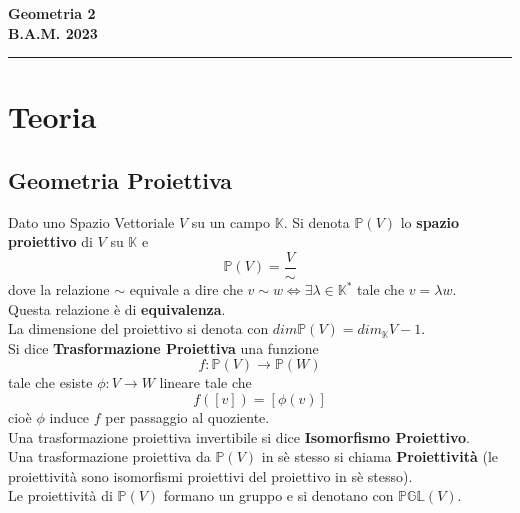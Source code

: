 \documentclass[a4paper,twoside]{article}
\newcommand{\Pro}{\mathbb{P}}
\newcommand{\K}{\mathbb{K}}
\theoremstyle{definition}
\numberwithin{theorem}{section}
\begin{document}
\setlength\parindent{0pt}
\thispagestyle{empty}
\begin{center}{\large \textbf{ {\Huge Geometria 2} \\
B.A.M. 2023}}
\end{center}
\rule{\textwidth}{1pt}
\tableofcontents
\newpage

\section{Teoria}
\subsection{Geometria Proiettiva}
Dato uno Spazio Vettoriale $V$ su un campo $\K$. Si denota $\Pro(V)$ lo \textbf{spazio proiettivo} di $V$ su $\K$ e
$$\Pro(V)= \frac{V}{\sim}$$
dove la relazione $\sim$ equivale a dire che $v\sim w \Leftrightarrow \exists\lambda\in\K^*$ tale che $v=\lambda w$.\\
Questa relazione è di \textbf{equivalenza}.\\
La dimensione del proiettivo si denota con $dim\Pro(V)=dim_\K V -1$.\\
Si dice \textbf{Trasformazione Proiettiva} una funzione $$f:\Pro(V)\to\Pro(W)$$
tale che esiste $\phi:V\to W$ lineare tale che $$f([v])=[\phi(v)]$$ cioè $\phi$ induce $f$ per passaggio al quoziente.\\
Una trasformazione proiettiva invertibile si dice \textbf{Isomorfismo Proiettivo}.\\

Una trasformazione proiettiva da $\Pro(V)$ in sè stesso si chiama \textbf{Proiettività} (le proiettività sono isomorfismi proiettivi del proiettivo in sè stesso).\\
Le proiettività di $\Pro(V)$ formano un gruppo e si denotano con $\mathbb{PGL}(V)$.\\
\end{document}
